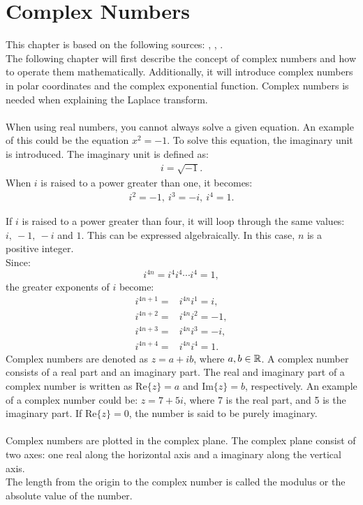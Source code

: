 \chapter{Complex Numbers}
This chapter is based on the following sources: \cite{complexpaul}, \cite{complexpurple}, \cite{complexnotebook}.
\\
\noindent 
The following chapter will first describe the concept of complex numbers and how to operate them mathematically. Additionally, it will introduce complex numbers in polar coordinates and the complex exponential function. Complex numbers is needed when explaining the Laplace transform.
\\\\
\noindent 
When using real numbers, you cannot always solve a given equation. An example of this could be the equation $x^2=-1$. To solve this equation, the imaginary unit is introduced. The imaginary unit is defined as:
\begin{align*}
i=\sqrt{-1}.
\end{align*}
When $i$ is raised to a power greater than one, it becomes:
\begin{align*}
i^2=-1,\  i^3=-i,\  i^4=1.
\end{align*}

\noindent If $i$ is raised to a power greater than four, it will loop through the same values: $i, \ -1, \ -i$ and $1$. This can be expressed algebraically. In this case, $n$ is a  positive integer. 
\\
Since: $$i^{4n} = i^4i^4\cdots i^4 = 1,$$
the greater exponents of $i$ become:
\begin{align*}
	i^{4n+1} =& i^{4n}i^1 = i, \\
	i^{4n+2} =& i^{4n}i^2 = -1, \\
	i^{4n+3} =& i^{4n}i^3 = -i, \\
	i^{4n+4} =& i^{4n}i^4 = 1.
\end{align*}
Complex numbers are denoted as $z = a+ib$, where $a,b\in \mathbb{R}$. A complex number consists of a real part and an imaginary part. The real and imaginary part of a complex number is written as $\text{Re}\{z\}=a$ and $\text{Im}\{z\}=b$, respectively.
An example of a complex number could be: $z=7+5i$, where 7 is the real part, and 5 is the imaginary part. 
If $\text{Re}\{z\}=0$, the number is said to be purely imaginary.  
\\\\
Complex numbers are plotted in the complex plane. The complex plane consist of two axes: one real along the horizontal axis and a imaginary along the vertical axis.\\
The length from the origin to the complex number is called the modulus or the absolute value of the number.

